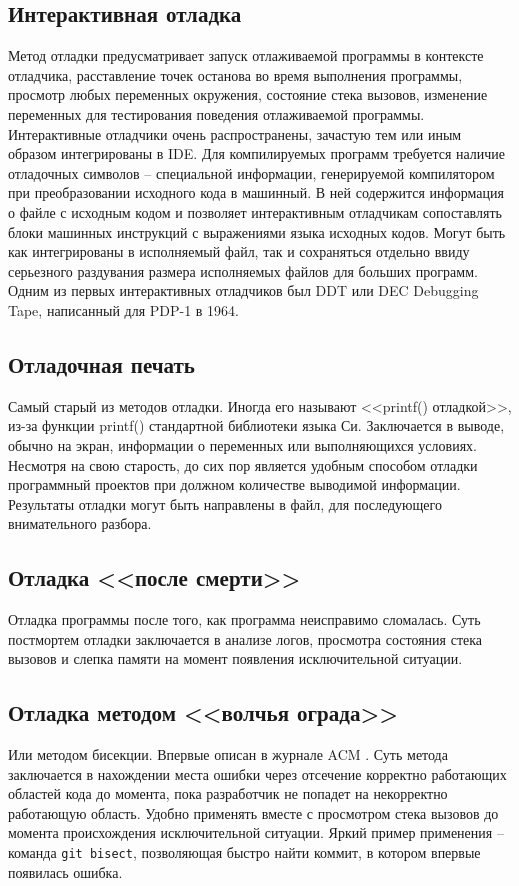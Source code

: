 \subsection{Интерактивная отладка}\label{sec:ch2/sec1/sub3/sub1}
Метод отладки предусматривает запуск отлаживаемой программы в контексте
отладчика, расставление точек останова во время выполнения программы, просмотр
любых переменных окружения, состояние стека вызовов, изменение переменных
для тестирования поведения отлаживаемой программы.
Интерактивные отладчики очень распространены, зачастую тем или иным образом
интегрированы в IDE. Для компилируемых программ требуется наличие отладочных
символов -- специальной информации, генерируемой компилятором при 
преобразовании исходного кода в машинный. В ней содержится информация о 
файле с исходным кодом и позволяет интерактивным отладчикам сопоставлять
блоки машинных инструкций с выражениями языка исходных кодов. Могут
быть как интегрированы в исполняемый файл, так и сохраняться отдельно ввиду
серьезного раздувания размера исполняемых файлов для больших программ.
Одним из первых интерактивных отладчиков был DDT или DEC Debugging Tape,
написанный для PDP-1 в 1964.

\subsection{Отладочная печать}\label{sec:ch2/sec1/sub3/sub2}
Самый старый из методов отладки. Иногда его называют <<printf() отладкой>>, 
из-за функции printf() стандартной библиотеки языка Си. Заключается
в выводе, обычно на экран, информации о переменных или выполняющихся
условиях. Несмотря на свою старость, до сих пор является удобным способом 
отладки программный проектов при должном количестве выводимой информации.
Результаты отладки могут быть направлены в файл, для последующего внимательного
разбора.

\subsection{Отладка <<после смерти>>}\label{sec:ch2/sec1/sub3/sub3}
Отладка программы после того, как программа неисправимо сломалась.
Суть постмортем отладки заключается в анализе логов, просмотра состояния
стека вызовов и слепка памяти на момент появления исключительной ситуации.

\subsection{Отладка методом <<волчья ограда>>}\label{sec:ch2/sec1/sub3/sub4}
Или методом бисекции. Впервые описан в журнале ACM \autocite{wolf-fence}. 
Суть метода заключается в нахождении места ошибки через отсечение корректно
работающих областей кода до момента, пока разработчик не попадет на некорректно
работающую область. Удобно применять вместе с просмотром стека вызовов до момента
происхождения исключительной ситуации. Яркий пример применения -- команда
\verb|git bisect|, позволяющая быстро найти коммит, в котором впервые
появилась ошибка.


